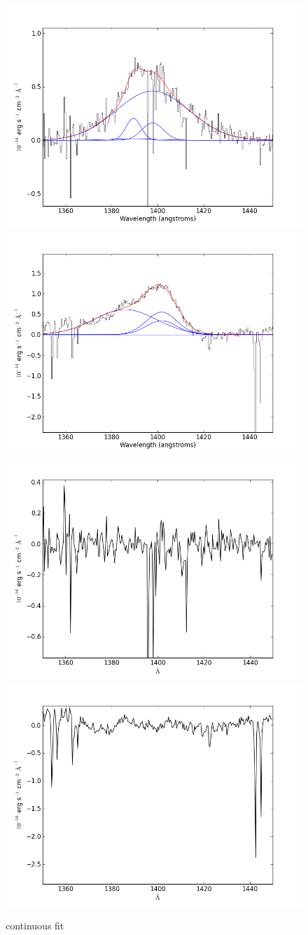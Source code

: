 \documentclass[usenatbib]{mn2e}
\begin{document}
\newpage

\begin{figure}
\begin{center}
\includegraphics[width=0.46\linewidth,angle=0]{SiIV_2.png}
\vspace{5mm}
\includegraphics[width=0.49\linewidth,angle=0]{SiIV_3.png}\\
\includegraphics[width=0.46\linewidth,angle=0]{SiIV_res_2.png}
\hspace{5mm}
\includegraphics[width=0.49\linewidth,angle=0]{SiIV_res_3.png}\\
\end{center} 
\caption{continuous fit \label{fig:landscape}}   
\end{figure}
\end{document}
